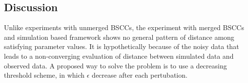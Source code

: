 \subsection{Discussion}
Unlike experiments with unmerged BSCCs, the experiment with merged BSCCs and simulation based
framework shows no general pattern of distance among satisfying parameter values. It is
hypothetically because of the noisy data that leads to a non-converging evaluation of distance
between simulated data and observed data. A proposed way to solve the problem is to use a decreasing
threshold scheme, in which $\epsilon$ decrease after each pertubation.

